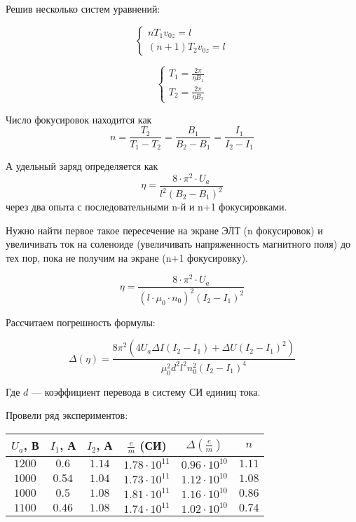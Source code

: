 Решив несколько систем уравнений:

$$
\begin{cases}
nT_1v_{0z}=l\\
(n+1)T_2v_{0z}=l
\end{cases}
$$

$$
\begin{cases}
T_1=\frac{2\pi}{\eta{}B_1}\\
T_2=\frac{2\pi}{\eta{}B_2}
\end{cases}
$$

Число фокусировок находится как $$n=\frac{T_2}{T_1-T_2}=\frac{B_1}{B_2-B_1}=\frac{I_1}{I_2-I_1}$$

А удельный заряд определяется как $$\eta=\frac{8\cdot\pi^2\cdot{}U_a}{l^2(B_2-B_1)^2}$$  через два опыта с последовательными n-й и n+1 фокусировками.

Нужно найти первое такое пересечение на экране ЭЛТ (n фокусировок) и увеличивать ток на соленоиде (увеличивать напряженность магнитного поля) до тех пор, пока не получим на экране (n+1 фокусировку).

$$\eta=\frac{8\cdot\pi^2\cdot{}U_a}{(l\cdot\mu_0\cdot{n_0})^2(I_2-I_1)^2}$$

Рассчитаем погрешность формулы:

$$\Delta{(\eta)}=\frac{8 \pi^{2} \left(4 U_{a} \Delta{I} \left(I_{2} - I_{1}\right) + \Delta{U} \left(I_{2} - I_{1}\right)^{2}\right)}{\mu_{0}^{2} d^{2} l^{2} n_{0}^{2} \left(I_{2} - I_{1}\right)^{4}}$$

Где $d$ --- коэффициент перевода в систему СИ единиц тока.

Провели ряд экспериментов: 

\begin{table}[h]
\begin{center}
\begin{tabular}{|c|c|c|c|c|c|}

\hline
$U_a$, В & $I_1$, А & $I_2$, А & $\frac{e}{m}$ (СИ) & $\Delta{(\frac{e}{m})}$ & $n$\\
\hline
$1200$ & $0.6$ & $1.14$ & $1.78\cdot10^{11}$ & $0.96\cdot10^{10}$  & $1.11$ \\ \hline
$1000$ & $0.54$ & $1.04$ & $1.73\cdot10^{11}$ & $1.12\cdot10^{10}$ & $1.08$ \\ \hline
$1000$ & $0.5$ & $1.08$ & $1.81\cdot10^{11}$ & $1.16\cdot10^{10}$  & $0.86$ \\ \hline
$1100$ & $0.46$ & $1.08$ & $1.74\cdot10^{11}$ & $1.02\cdot10^{10}$ & $0.74$ \\ \hline

\end{tabular}
\end{center}
\end{table} 


